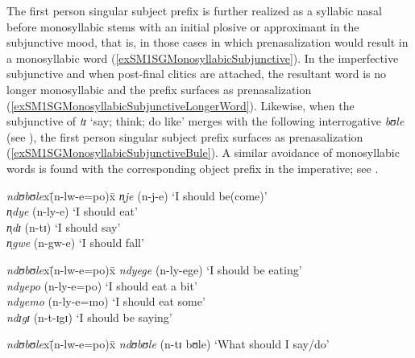 \label{MonosyllabicSubjunctives}The first person singular subject prefix is further realized as a syllabic nasal before monosyllabic stems with an initial plosive or approximant in the subjunctive mood, that is, in those cases in which prenasalization would result in a monosyllabic word (\ref{exSM1SGMonosyllabicSubjunctive}). In the imperfective subjunctive and when post-final clitics are attached, the resultant word is no longer monosyllabic and the prefix surfaces as prenasalization (\ref{exSM1SGMonosyllabicSubjunctiveLongerWord}). Likewise, when the subjunctive of \textit{tɪ} \lq say; think; do like' merges with the following interrogative \textit{bʊle} (see ), the first person singular subject prefix surfaces as prenasalization (\ref{exSM1SGMonosyllabicSubjunctiveBule}). A similar avoidance of monosyllabic words is found with the corresponding object prefix in the imperative; see .

\begin{exe}
	\ex \label{exSM1SGMonosyllabicSubjunctive}
	\begin{tabbing}
		\textit{ndʊbʊle}x\=(\degree n-lw-e=po)x\=\kill %
		\textit{n̩je} \> (\degree n-j-e) \> \lq I should be(come)'\\
		\textit{n̩dye} \> (\degree n-ly-e) \> \lq I should eat'\\
		\textit{n̩dɪ} \> (\degree n-tɪ) \> \lq I should say'\footnotemark\\
		\textit{n̩gwe} \> (\degree n-gw-e) \> \lq I should fall' %
	\end{tabbing}
	\ex \label{exSM1SGMonosyllabicSubjunctiveLongerWord}
	\begin{tabbing}
		\textit{ndʊbʊle}x\=(\degree n-lw-e=po)x\=\kill %
		\textit{ndyege} \> (\degree n-ly-ege) \> \lq I should be eating'\\
		\textit{ndyepo} \> (\degree n-ly-e=po) \> \lq I should eat a bit'\\
		\textit{ndyemo} \> (\degree n-ly-e=mo) \> \lq I should eat some'\\
		\textit{ndɪgɪ} \> (\degree n-t-ɪgɪ) \> \lq I should be saying'
	\end{tabbing}
	\ex \label{exSM1SGMonosyllabicSubjunctiveBule}
	\begin{tabbing}
		\textit{ndʊbʊle}x\=(\degree n-lw-e=po)x\=\kill %
		\textit{ndʊbʊle} \> (\degree n-tɪ bʊle) \> \lq What should I say/do'
	\end{tabbing}
\end{exe}
\protect{}

